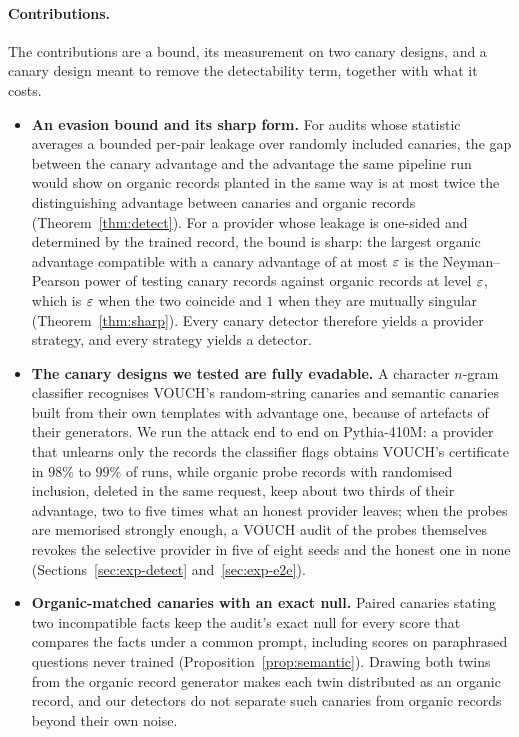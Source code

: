\paragraph{Contributions.} The contributions are a bound, its measurement on two canary
designs, and a canary design meant to remove the detectability term, together with what it costs.

\begin{itemize}
\item \textbf{An evasion bound and its sharp form.} For audits whose statistic averages a
bounded per-pair leakage over randomly included canaries, the gap between the canary advantage
and the advantage the same pipeline run would show on organic records planted in the same way
is at most twice the distinguishing advantage between canaries and organic records
(Theorem~\ref{thm:detect}). For a provider whose leakage is one-sided and determined by the
trained record, the bound is sharp: the largest organic advantage compatible with a canary
advantage of at most $\varepsilon$ is the Neyman--Pearson power of testing canary records against
organic records at level $\varepsilon$, which is $\varepsilon$ when the two coincide and $1$ when they are
mutually singular (Theorem~\ref{thm:sharp}). Every canary detector therefore yields a provider
strategy, and every strategy yields a detector.

\item \textbf{The canary designs we tested are fully evadable.} A character $n$-gram classifier
recognises VOUCH's random-string canaries and semantic canaries built from their own
templates with advantage one, because of artefacts of their generators. We run the attack
end to end on Pythia-410M: a provider that unlearns only the records the classifier flags
obtains VOUCH's certificate in $98\%$ to $99\%$ of runs, while organic probe records with
randomised inclusion, deleted in the same request, keep about two thirds of their advantage,
two to five times what an honest provider leaves; when the probes are memorised strongly
enough, a VOUCH audit of the probes themselves revokes the selective provider in five of
eight seeds and the honest one in none (Sections~\ref{sec:exp-detect}
and~\ref{sec:exp-e2e}).

\item \textbf{Organic-matched canaries with an exact null.} Paired canaries stating two
incompatible facts keep the audit's exact null for every score that compares the facts
under a common prompt, including scores on paraphrased questions never trained
(Proposition~\ref{prop:semantic}). Drawing both twins from the organic record generator
makes each twin distributed as an organic record, and our detectors do not separate such
canaries from organic records beyond their own noise.


\end{itemize}
